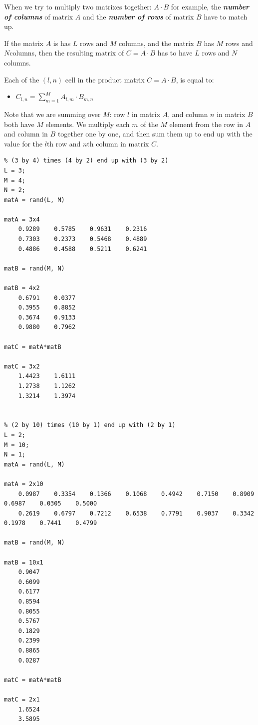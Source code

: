 \documentclass[
]{book}
\providecommand{\tightlist}{%
  \setlength{\itemsep}{0pt}\setlength{\parskip}{0pt}}
\begin{document}
When we try to multiply two matrixes together: \(A\cdot B\) for example,
the \textbf{\emph{number of columns}} of matrix \(A\) and the \textbf{\emph{number of rows}}
of matrix \(B\) have to match up.

If the matrix \(A\) is has \(L\) rows and \(M\) columns, and the matrix \(B\)
has \(M\) rows and \(N\)columns, then the resulting matrix of \(C=A\cdot B\)
has to have \(L\) rows and \(N\) columns.

Each of the \((l,n)\) cell in the product matrix \(C=A\cdot B\), is equal
to:

\begin{itemize}
\tightlist
\item
  \(\displaystyle C_{l,n} =\sum_{m=1}^M A_{l,m} \cdot B_{m,n}\)
\end{itemize}

Note that we are summing over \(M\): row \(l\) in matrix \(A\), and column \(n\)
in matrix \(B\) both have \(M\) elements. We multiply each \(m\) of the \(M\)
element from the row in \(A\) and column in \(B\) together one by one, and
then sum them up to end up with the value for the \(l\)th row and \(n\)th
column in matrix \(C\).

\begin{verbatim}
% (3 by 4) times (4 by 2) end up with (3 by 2)
L = 3;
M = 4;
N = 2;
matA = rand(L, M)

matA = 3x4    
    0.9289    0.5785    0.9631    0.2316
    0.7303    0.2373    0.5468    0.4889
    0.4886    0.4588    0.5211    0.6241

matB = rand(M, N)  

matB = 4x2    
    0.6791    0.0377
    0.3955    0.8852
    0.3674    0.9133
    0.9880    0.7962

matC = matA*matB

matC = 3x2    
    1.4423    1.6111
    1.2738    1.1262
    1.3214    1.3974


% (2 by 10) times (10 by 1) end up with (2 by 1)
L = 2;
M = 10;
N = 1;
matA = rand(L, M)

matA = 2x10    
    0.0987    0.3354    0.1366    0.1068    0.4942    0.7150    0.8909    0.6987    0.0305    0.5000
    0.2619    0.6797    0.7212    0.6538    0.7791    0.9037    0.3342    0.1978    0.7441    0.4799

matB = rand(M, N)  

matB = 10x1    
    0.9047
    0.6099
    0.6177
    0.8594
    0.8055
    0.5767
    0.1829
    0.2399
    0.8865
    0.0287

matC = matA*matB

matC = 2x1    
    1.6524
    3.5895
\end{verbatim}
\end{document}

